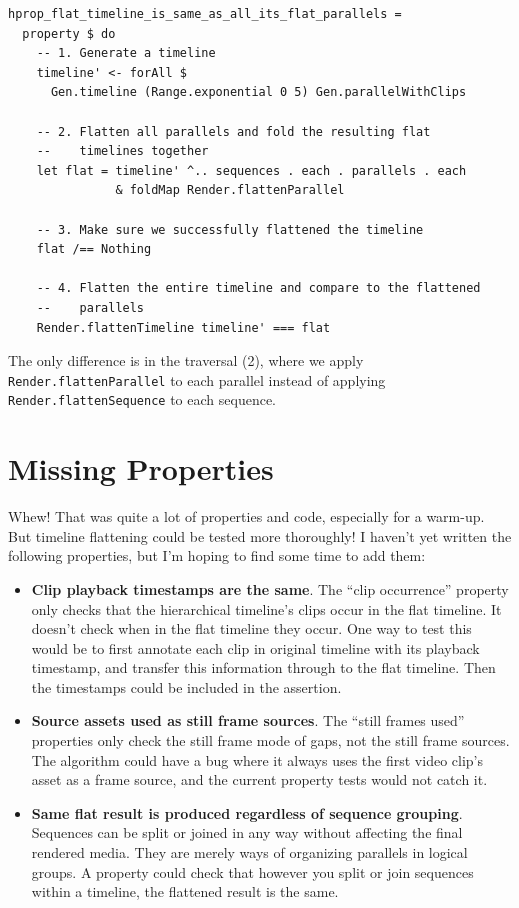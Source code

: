 \begin{verbatim}
hprop_flat_timeline_is_same_as_all_its_flat_parallels =
  property $ do
    -- 1. Generate a timeline
    timeline' <- forAll $
      Gen.timeline (Range.exponential 0 5) Gen.parallelWithClips
  
    -- 2. Flatten all parallels and fold the resulting flat
    --    timelines together
    let flat = timeline' ^.. sequences . each . parallels . each
               & foldMap Render.flattenParallel
  
    -- 3. Make sure we successfully flattened the timeline
    flat /== Nothing
  
    -- 4. Flatten the entire timeline and compare to the flattened 
    --    parallels
    Render.flattenTimeline timeline' === flat
\end{verbatim}
The only difference is in the traversal (2), where we apply \texttt{Render.flattenParallel} to each parallel instead of applying \texttt{Render.flattenSequence} to each sequence.


\section{Missing Properties}

Whew! That was quite a lot of properties and code, especially for a warm-up. But timeline flattening could be tested more thoroughly! I haven't yet written the following properties, but I'm hoping to find some time to add them:

\begin{itemize}
\item \textbf{Clip playback timestamps are the same}. The ``clip occurrence'' property only checks that the hierarchical timeline's clips occur in the flat timeline. It doesn't check when in the flat timeline they occur. One way to test this would be to first annotate each clip in original timeline with its playback timestamp, and transfer this information through to the flat timeline. Then the timestamps could be included in the assertion.

\item \textbf{Source assets used as still frame sources}. The ``still frames used'' properties only check the still frame mode of gaps, not the still frame sources. The algorithm could have a bug where it always uses the first video clip's asset as a frame source, and the current property tests would not catch it.

\item \textbf{Same flat result is produced regardless of sequence grouping}. Sequences can be split or joined in any way without affecting the final rendered media. They are merely ways of organizing parallels in logical groups. A property could check that however you split or join sequences within a timeline, the flattened result is the same.
\end{itemize}

